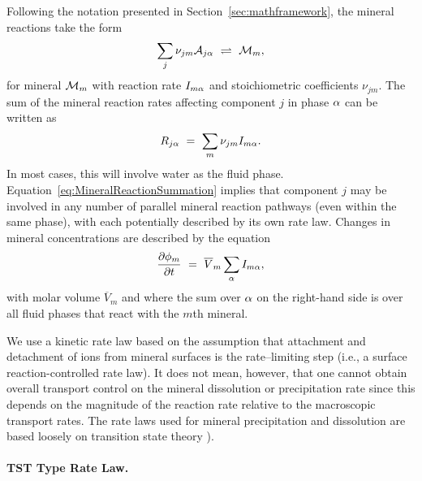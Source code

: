 Following the notation presented in Section~\ref{sec:mathframework},
the mineral reactions take the form
%
\begin{equation} 
 \sum_j\nu_{jm} {\mathcal A}_{j{\alpha}} ~\rightleftharpoons~ {\mathcal M}_m,
 \label{heterogeneous-restated}
\end{equation}
%
for mineral ${\mathcal M}_m$ with reaction rate $I_{m{\alpha}}$ and stoichiometric
coefficients $\nu_{jm}$.  The sum of the mineral reaction rates
affecting component $j$ in phase ${\alpha}$ can be written as
%
\begin{equation} 
 R_{j{\alpha}} \ =\  \sum_m\nu_{jm} I_{m{{\alpha}}}.
 \label{eq:MineralReactionSummation}
\end{equation} 
In most cases, this will involve water as the fluid phase.
Equation~\eqref{eq:MineralReactionSummation} implies that component $j$
may be involved in any number of parallel mineral reaction pathways
(even within the same phase), with each potentially described by its
own rate law.  Changes in mineral concentrations are described by the
equation
%
\begin{equation}
  \frac{\partial \phi_m}{\partial t} \ =\  \overline V_m \sum_{\alpha} I_{m{\alpha}},
\end{equation} 
%
with molar volume $\overline V_m$ and where the sum over ${\alpha}$ on the
right-hand side is over all fluid phases that react with the $m$th
mineral.

We use a kinetic rate law based on the assumption that attachment and detachment of ions from mineral surfaces is the rate--limiting step (i.e., a surface reaction-controlled rate law). It does not mean, however, that one cannot obtain overall transport control on the mineral dissolution or precipitation rate since this depends on the magnitude of the reaction rate relative to the macroscopic transport rates. The rate laws used for mineral precipitation and dissolution are based loosely on transition state theory \citep{lasaga_1981,aagaard_1982,lasaga_1984}). 

\paragraph{TST Type Rate Law.}

